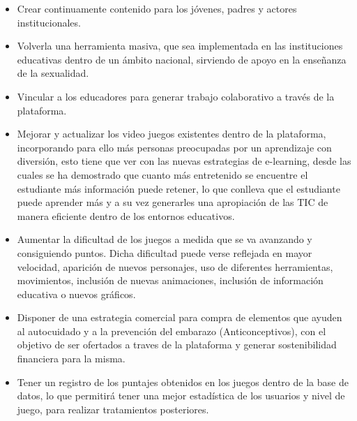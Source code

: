 \documentclass[journal,transmag]{IEEEtran}
\begin{document}
\begin{itemize}
\item Crear continuamente contenido para los jóvenes, padres y actores institucionales.
\item Volverla una herramienta masiva, que sea implementada en las instituciones educativas dentro de un ámbito nacional, sirviendo de apoyo en la enseñanza de la sexualidad.
\item Vincular a los educadores para generar trabajo colaborativo a través de la plataforma.
\item Mejorar y actualizar los video juegos existentes dentro de la plataforma, incorporando para ello más personas preocupadas por un aprendizaje con diversión, esto tiene que ver con las nuevas estrategias de e-learning, desde las cuales se ha demostrado que cuanto más entretenido se encuentre el estudiante más información puede retener, lo que conlleva que el estudiante puede aprender más y a su vez generarles una apropiación de las TIC de manera eficiente dentro de los entornos educativos.
\item Aumentar la dificultad de los juegos a medida que se va avanzando y consiguiendo puntos. Dicha dificultad puede verse reflejada en mayor velocidad, aparición de nuevos personajes, uso de diferentes herramientas, movimientos, inclusión de nuevas animaciones, inclusión de información educativa o nuevos gráficos.
\item Disponer de una estrategia comercial para compra de elementos que ayuden al autocuidado y a la prevención del embarazo (Anticonceptivos), con el objetivo de ser ofertados a traves de la plataforma y generar sostenibilidad financiera para la misma.
\item Tener un registro de los puntajes obtenidos en los juegos dentro de la base de datos, lo que permitirá tener una mejor estadística de los usuarios y nivel de juego, para realizar tratamientos posteriores.
\end{itemize}



\end{document}
